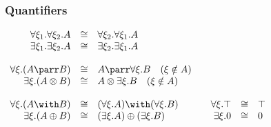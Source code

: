 \subsubsection{Quantifiers}\label{quantifiers-1}

\(\begin{array}{rclcrcl}
  \forall \xi_1. \forall\xi_2. A & \cong&  \forall\xi_2. \forall\xi_1. A\\
  \exists \xi_1. \exists\xi_2.A & \cong&  \exists\xi_2.\exists\xi_1.A\\
\\
  \forall \xi . (A \parr B) & \cong&  A \parr \forall \xi.B \quad (\xi\notin A) \\
  \exists \xi . (A \tens B) & \cong&  A \tens \exists \xi.B \quad (\xi\notin A) \\
\\
  \forall \xi . (A \with B) & \cong&  (\forall \xi . A) \with (\forall \xi . B) &  &  \forall \xi . \top & \cong&  \top \\
  \exists \xi . (A \plus B) & \cong&  (\exists \xi . A) \plus (\exists \xi . B) &  &  \exists \xi . \zero & \cong&  \zero
\end{array}\)


